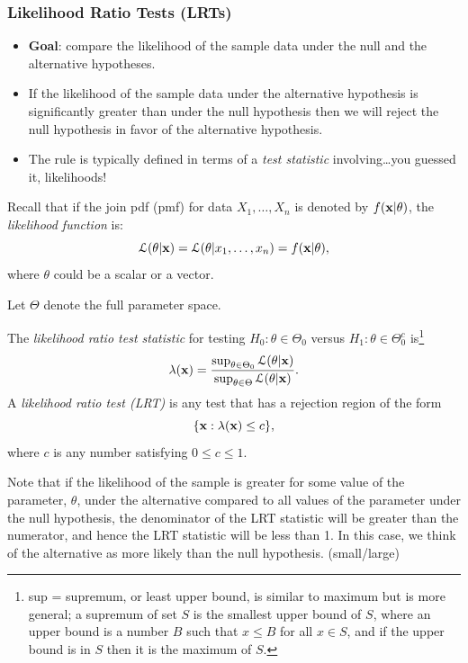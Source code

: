 \documentclass[11pt,]{article}
\providecommand{\tightlist}{%
  \setlength{\itemsep}{0pt}\setlength{\parskip}{0pt}}
\let\rmarkdownfootnote\footnote%
\def\footnote{\protect\rmarkdownfootnote}
\def\bx{{\bf x}}
\def\Lsc{{\cal L}}
\begin{document}
\hypertarget{likelihood-ratio-tests-lrts}{%
\subsubsection{Likelihood Ratio Tests
(LRTs)}\label{likelihood-ratio-tests-lrts}}

\begin{itemize}
\tightlist
\item
  \textbf{Goal}: compare the likelihood of the sample data under the
  null and the alternative hypotheses.
\item
  If the likelihood of the sample data under the alternative hypothesis
  is significantly greater than under the null hypothesis then we will
  reject the null hypothesis in favor of the alternative hypothesis.
\item
  The rule is typically defined in terms of a \emph{test statistic}
  involving\ldots{}you guessed it, likelihoods!
\end{itemize}

Recall that if the join pdf (pmf) for data \(X_1, \ldots, X_n\) is
denoted by \(f(\bx | \theta)\), the \emph{likelihood function} is:
\[ \Lsc(\theta | \bx) = \Lsc(\theta | x_1, \ldots,x_n) = f(\bx | \theta),\]
where \(\theta\) could be a scalar or a vector.

Let \(\Theta\) denote the full parameter space.

 The \emph{likelihood ratio test
statistic} for testing \(H_0: \theta \in \Theta_0\) versus
\(H_1: \theta \in \Theta_0^c\)
is\footnote{sup = supremum, or least upper bound, is similar to maximum but is more general; a supremum of set $S$ is the smallest upper bound of $S$, where an upper bound is a number $B$ such that $x\leq B$ for all $x\in S$, and if the upper bound is in $S$ then it is the maximum of $S$.}
\[\lambda(\bx) = \frac{\sup_{\theta \in\Theta_0} \Lsc(\theta | \bx)}{\sup_{\theta \in \Theta} \Lsc(\theta | \bx)}.\]
A \emph{likelihood ratio test (LRT)} is any test that has a rejection
region of the form \[{\{\bx: \lambda(\bx) \leq c\}},\] where \(c\) is
any number satisfying \(0\leq c \leq 1\).

Note that if the likelihood of the sample is greater for some value of
the parameter, \(\theta\), under the alternative compared to all values
of the parameter under the null hypothesis, the denominator of the LRT
statistic will be greater than the numerator, and hence the LRT
statistic will be less than 1. In this case, we think of the alternative
as more likely than the null hypothesis. (small/large)
\end{document}
